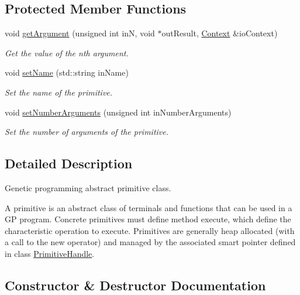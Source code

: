 \subsection*{Protected Member Functions}
\begin{DoxyCompactItemize}
\item 
void \hyperlink{classPuppy_1_1Primitive_a908bba73fb1b2df6c708c0235381bbac}{get\+Argument} (unsigned int in\+N, void $\ast$out\+Result, \hyperlink{classPuppy_1_1Context}{Context} \&io\+Context)
\begin{DoxyCompactList}\small\item\em Get the value of the nth argument. \end{DoxyCompactList}\item 
void \hyperlink{classPuppy_1_1Primitive_ae371fdd5d7c917f5fe0826e08f04ad11}{set\+Name} (std\+::string in\+Name)
\begin{DoxyCompactList}\small\item\em Set the name of the primitive. \end{DoxyCompactList}\item 
void \hyperlink{classPuppy_1_1Primitive_a11bb487496584214eb627bf6ae03fad2}{set\+Number\+Arguments} (unsigned int in\+Number\+Arguments)
\begin{DoxyCompactList}\small\item\em Set the number of arguments of the primitive. \end{DoxyCompactList}\end{DoxyCompactItemize}


\subsection{Detailed Description}
Genetic programming abstract primitive class.

A primitive is an abstract class of terminals and functions that can be used in a G\+P program. Concrete primitives must define method execute, which define the characteristic operation to execute. Primitives are generally heap allocated (with a call to the new operator) and managed by the associated smart pointer defined in class \hyperlink{classPuppy_1_1PrimitiveHandle}{Primitive\+Handle}. 

\subsection{Constructor \& Destructor Documentation}
\hypertarget{classPuppy_1_1Primitive_a17fd0027a0723bcb35b98f1b43eebeb6}{}
